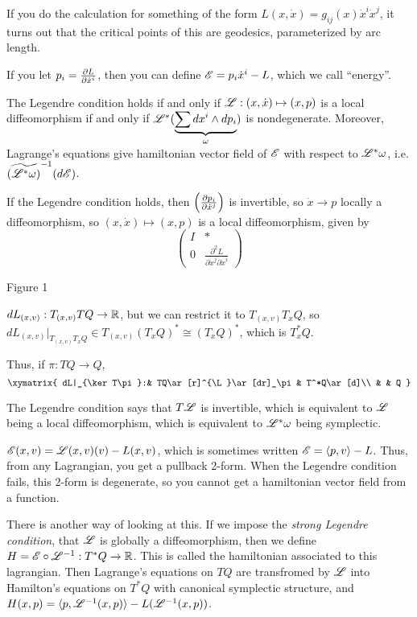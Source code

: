  If you do the calculation for something of the form
 $L(x,\dot{x})=g_{ij}(x)\dot{x}^i\dot{x}^j$, it turns out that the critical
 points of this are geodesics, parameterized by arc length.

 If you let $p_i = \frac{\partial L}{\partial \dot{x}^i}$, then you can define $\mathscr{E} =
 p_i\dot{x}^i - L$, which we call ``energy''.
 \begin{theorem}
   The Legendre condition holds if and only if $\mathscr{L}:(x,\dot{x})\mapsto
   (x,p)$ is a local diffeomorphism if and only if
   $\mathscr{L}^*(\underbrace{\sum dx^i\wedge dp_i}_{\omega})$ is nondegenerate.
   Moreover, Lagrange's equations give hamiltonian vector field of
   $\mathscr{E}$ with respect to $\mathscr{L}^*\omega$, i.e.
   $\widetilde{(\mathscr{L}^*\omega)}^{-1}(d\mathscr{E})$.
 \end{theorem}
   If the Legendre condition holds, then
   $\left(\frac{\partial p_i}{\partial \dot{x}^j}\right)$ is invertible, so $\dot{x}\to p$
   locally a diffeomorphism, so $(x,\dot{x})\mapsto (x,p)$ is a local
   diffeomorphism, given by
   \[\left(\begin{array}{cc}
   I & \ast\\
   0 & \frac{\partial^2L}{\partial \dot{x}^j \partial \dot{x}^i}
   \end{array}\right)\]

 Figure 1

 $dL_{(x,v)}:T_{(x,v)}TQ\to \mathbb{R}$, but we can restrict it to
 $T_{(x,v)}T_xQ$, so $dL_{(x,v)}|_{T_{(x,v)}T_xQ} \in
 T_{(x,v)}(T_xQ)^* \cong (T_xQ)^*$, which is $T^*_xQ$.

 Thus, if $\pi:TQ\to Q$,
 \[\xymatrix{
 dL|_{\ker T\pi}:& TQ\ar[r]^{\L}\ar[dr]_\pi & T^*Q\ar[d]\\
 & & Q
 }\]

 The Legendre condition says that $T\mathscr{L}$ is invertible, which is
 equivalent to $\mathscr{L}$ being a local diffeomorphism, which is
 equivalent to $\mathscr{L}^*\omega$ being symplectic.

 $\mathscr{E}(x,v)=\mathscr{L}(x,v)(v)-L(x,v)$, which is sometimes written $\mathscr{E} =
 \langle p,v\rangle - L$.  Thus, from any Lagrangian, you get a
 pullback 2-form.  When the Legendre condition fails, this 2-form
 is degenerate, so you cannot get a hamiltonian vector field from
 a function.

 There is another way of looking at this.  If we impose the
 \emph{strong Legendre condition}, that $\mathscr{L}$ is globally a
 diffeomorphism, then we define $H=\mathscr{E}\circ \mathscr{L}^{-1}:T^*Q\to \mathbb{R}$.
 This is called the hamiltonian associated to this lagrangian.
 Then Lagrange's equations on $TQ$ are transfromed by $\mathscr{L}$ into
 Hamilton's equations on $T^*Q$ with canonical symplectic
 structure, and $H(x,p)=\langle p,\mathscr{L}^{-1}(x,p)\rangle -
 L(\mathscr{L}^{-1}(x,p))$.

